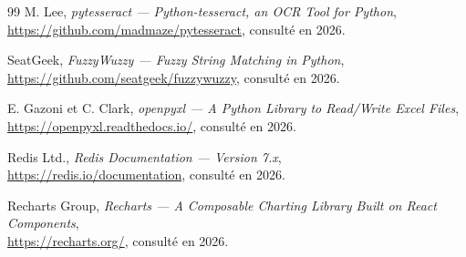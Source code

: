 \begin{thebibliography}{99}
M. Lee, \emph{pytesseract --- Python-tesseract, an OCR Tool for Python},\\
\url{https://github.com/madmaze/pytesseract}, consulté en 2026.

SeatGeek, \emph{FuzzyWuzzy --- Fuzzy String Matching in Python},\\
\url{https://github.com/seatgeek/fuzzywuzzy}, consulté en 2026.

E. Gazoni et C. Clark, \emph{openpyxl --- A Python Library to Read/Write Excel Files},\\
\url{https://openpyxl.readthedocs.io/}, consulté en 2026.

Redis Ltd., \emph{Redis Documentation --- Version 7.x},\\
\url{https://redis.io/documentation}, consulté en 2026.

Recharts Group, \emph{Recharts --- A Composable Charting Library Built on React Components},\\
\url{https://recharts.org/}, consulté en 2026.

\end{thebibliography}
